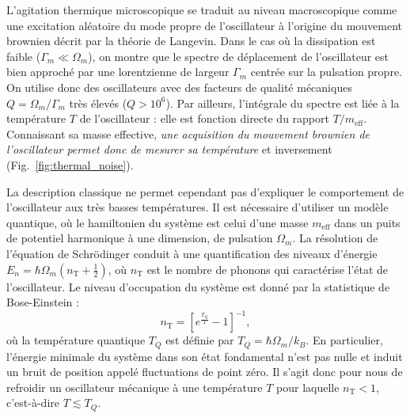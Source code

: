\documentclass[12pt,a4paper]{article}
\begin{document}
L'agitation thermique microscopique se traduit au niveau macroscopique comme une excitation aléatoire du mode propre de l'oscillateur à l'origine du mouvement brownien décrit par la théorie de Langevin.
Dans le cas où la dissipation est faible ($\Gamma_m \ll \Omega_m$), on montre que le spectre de déplacement de l'oscillateur est bien approché par une lorentzienne de largeur $\Gamma_m$ centrée sur la pulsation propre.
On utilise donc des oscillateurs avec des facteurs de qualité mécaniques $Q=\Omega_m/\Gamma_m$ très élevés ($Q>10^6$).
Par ailleurs, l'intégrale du spectre est liée à la température $T$ de l'oscillateur : elle est fonction directe du rapport $T/m_\mathrm{eff}$.
Connaissant sa masse effective, \textit{une acquisition du mouvement brownien de l'oscillateur permet donc de mesurer sa température} et inversement (Fig.~\ref{fig:thermal_noise}).

La description classique ne permet cependant pas d'expliquer le comportement de l'oscillateur aux très basses températures.
Il est nécessaire d'utiliser un modèle quantique, où le hamiltonien du système est celui d'une masse $m_\mathrm{eff}$ dans un puits de potentiel harmonique à une dimension, de pulsation $\Omega_m$.
La résolution de l'équation de Schrödinger conduit à une quantification des niveaux d'énergie $E_n = \hbar\Omega_m (n_\mathrm{T}+\frac{1}{2})$, où $n_\mathrm{T}$ est le nombre de phonons qui caractérise l'état de l'oscillateur.
Le niveau d'occupation du système est donné par la statistique de Bose-Einstein :
\begin{equation}
n_\mathrm{T} = \left[ e^\frac{T_Q}{T} -1\right]^{-1},
\label{eq:phonon_number}
\end{equation}
où la température quantique $T_Q$ est définie par $T_Q = \hbar\Omega_m/k_B$.
En particulier, l'énergie minimale du système dans son état fondamental n'est pas nulle et induit un bruit de position appelé \og fluctuations de point zéro\fg{}.
Il s'agit donc pour nous de refroidir un oscillateur mécanique à une température $T$ pour laquelle $n_\mathrm{T} < 1$, c'est-à-dire $T \lesssim T_Q$.
\end{document}
